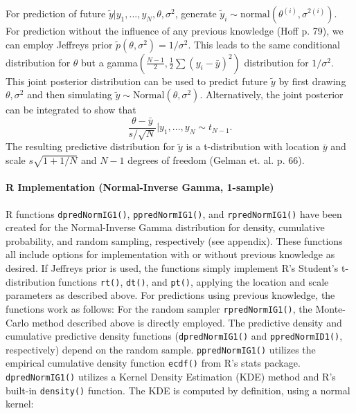 \documentclass[12pt, a4paper]{article}
\begin{document}
        For prediction of future $\tilde{y}|y_1,...,y_N,\theta,\sigma^2$, generate $\tilde{y}_i \sim \text{normal}\left(\theta^{(i)},\sigma^{2(i)}\right)$.\\

        For prediction without the influence of any previous knowledge (Hoff p. 79), we can employ Jeffreys prior $\tilde{p}\left(\theta,\sigma^2\right) = 1/\sigma^2$.  This leads to the same conditional distribution for $\theta$ but a gamma$\left(\frac{N-1}{2},\frac{1}{2}\sum\left(y_i - \bar{y}\right)^2\right)$ distribution for $1/\sigma^2$.  This joint posterior distribution can be used to predict future $\tilde{y}$ by first drawing $\theta,\sigma^2$ and then simulating $\tilde{y}\sim\text{Normal}\left(\theta,\sigma^2\right)$.   Alternatively, the joint posterior can be integrated to show that
        $$\dfrac{\theta-\bar{y}}{s/\sqrt{N}}|y_1,...,y_N\sim t_{N-1}.$$
        The resulting predictive distribution for $\tilde{y}$ is a t-distribution with location $\bar{y}$ and scale $s\sqrt{1+1/N}$ and $N-1$ degrees of freedom (Gelman et. al. p. 66).


      \paragraph{R Implementation (Normal-Inverse Gamma, 1-sample)}
      R functions \texttt{dpredNormIG1()}, \texttt{ppredNormIG1()}, and \texttt{rpredNormIG1()} have been created for the Normal-Inverse Gamma distribution for density, cumulative probability, and random sampling, respectively (see appendix).  These functions all include options for implementation with or without previous knowledge as desired.  If Jeffreys prior is used, the functions simply implement R's Student's t-distribution functions \texttt{rt()}, \texttt{dt()}, and \texttt{pt()}, applying the location and scale parameters as described above.  For predictions using previous knowledge, the functions work as follows:  For the random sampler \texttt{rpredNormIG1()}, the Monte-Carlo method described above is directly employed.  The predictive density and cumulative predictive density functions (\texttt{dpredNormIG1()} and \texttt{ppredNormID1()}, respectively) depend on the random sample.  \texttt{ppredNormIG1()} utilizes the empirical cumulative density function \texttt{ecdf()} from R's stats package.  \texttt{dpredNormIG1()} utilizes a Kernel Density Estimation (KDE) method and R's built-in \texttt{density()} function.  The KDE is computed by definition, using a normal kernel:
\end{document}
